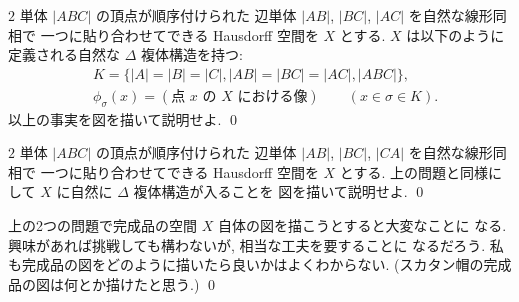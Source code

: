 \documentclass[12pt,twoside]{jarticle}
\begin{document}
\begin{question}
\label{q:dunce-cap}
 $2$ 単体 $|ABC|$ の頂点が順序付けられた
 辺単体 $|AB|$, $|BC|$, $|AC|$ を自然な線形同相で
 一つに貼り合わせてできる Hausdorff 空間を $X$ とする.
 $X$ は以下のように定義される自然な $\Delta$ 複体構造を持つ:
 \begin{align*}
  &
  K = \{ |A|=|B|=|C|, |AB|=|BC|=|AC|, |ABC| \},
  \\ &
  \phi_{\sigma}(x) = (\text{点 $x$ の $X$ における像}) 
  \qquad(x\in\sigma\in K).
 \end{align*}
 以上の事実を図を描いて説明せよ. \qed
\end{question}

\begin{question}
\label{q:hatcher-non-Delta-complex-example}
 $2$ 単体 $|ABC|$ の頂点が順序付けられた
 辺単体 $|AB|$, $|BC|$, $|CA|$ を自然な線形同相で
 一つに貼り合わせてできる Hausdorff 空間を $X$ とする.
 上の問題と同様にして $X$ に自然に $\Delta$ 複体構造が入ることを
 図を描いて説明せよ.
 \qed
\end{question}

\begin{rem}
 上の2つの問題で完成品の空間 $X$ 自体の図を描こうとすると大変なことに
 なる. 興味があれば挑戦しても構わないが, 相当な工夫を要することに
 なるだろう.  私も完成品の図をどのように描いたら良いかはよくわからない.
 (スカタン帽の完成品の図は何とか描けたと思う.)
 \qed
\end{rem}

%
%
%
%
\end{document}
